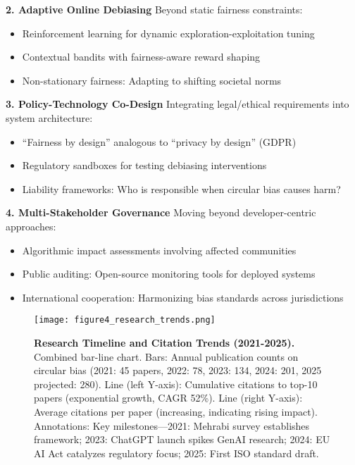 \documentclass[11pt,a4paper]{article}
\begin{document}
\textbf{2. Adaptive Online Debiasing}  
Beyond static fairness constraints:
\begin{itemize}
    \item Reinforcement learning for dynamic exploration-exploitation tuning  
    \item Contextual bandits with fairness-aware reward shaping  
    \item Non-stationary fairness: Adapting to shifting societal norms
\end{itemize}

\textbf{3. Policy-Technology Co-Design}  
Integrating legal/ethical requirements into system architecture:
\begin{itemize}
    \item ``Fairness by design'' analogous to ``privacy by design'' (GDPR)  
    \item Regulatory sandboxes for testing debiasing interventions  
    \item Liability frameworks: Who is responsible when circular bias causes harm?
\end{itemize}

\textbf{4. Multi-Stakeholder Governance}  
Moving beyond developer-centric approaches:
\begin{itemize}
    \item Algorithmic impact assessments involving affected communities  
    \item Public auditing: Open-source monitoring tools for deployed systems  
    \item International cooperation: Harmonizing bias standards across jurisdictions
\end{itemize}

\begin{figure}[htbp]
    \centering
    \texttt{[image: figure4\_research\_trends.png]}
    \caption{\textbf{Research Timeline and Citation Trends (2021-2025).} Combined bar-line chart. Bars: Annual publication counts on circular bias (2021: 45 papers, 2022: 78, 2023: 134, 2024: 201, 2025 projected: 280). Line (left Y-axis): Cumulative citations to top-10 papers (exponential growth, CAGR 52\%). Line (right Y-axis): Average citations per paper (increasing, indicating rising impact). Annotations: Key milestones—2021: Mehrabi survey establishes framework; 2023: ChatGPT launch spikes GenAI research; 2024: EU AI Act catalyzes regulatory focus; 2025: First ISO standard draft.}
    \label{fig:research_trends}
\end{figure}
\end{document}
